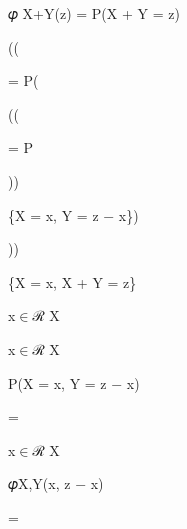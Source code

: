 \documentclass[a4paper,portrait,12pt]{article}
\begin{document}
\begin{flushleft}
𝜑 X+Y(z) = P(X + Y = z)
\end{flushleft}





((


\begin{flushleft}
= P(
\end{flushleft}


((


\begin{flushleft}
= P
\end{flushleft}





))


\begin{flushleft}
\{X = x, Y = z $-$ x\})
\end{flushleft}


))


\begin{flushleft}
\{X = x, X + Y = z\}
\end{flushleft}





\begin{flushleft}
x$\in$ℛ X
\end{flushleft}





\begin{flushleft}
x$\in$ℛ X
\end{flushleft}





\begin{flushleft}
P(X = x, Y = z $-$ x)
\end{flushleft}





=


\begin{flushleft}
x$\in$ℛ X
\end{flushleft}





\begin{flushleft}
𝜑X,Y(x, z $-$ x)
\end{flushleft}





=
\end{document}
